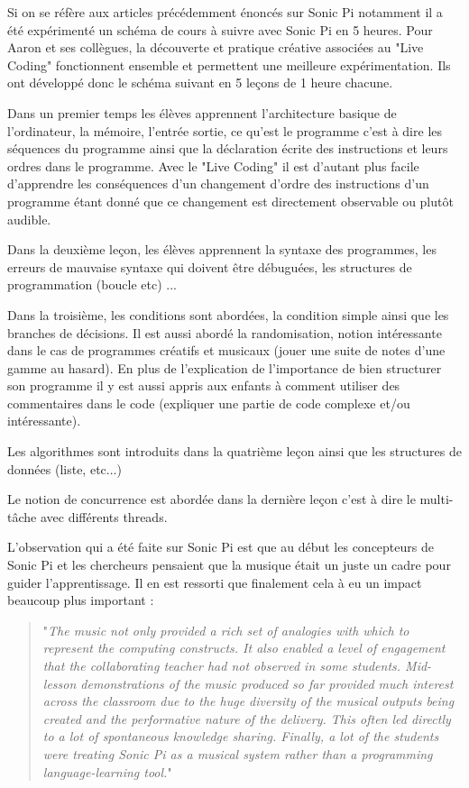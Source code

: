 Si on se réfère aux articles précédemment énoncés sur Sonic Pi notamment \cite{19} il a été expérimenté un schéma de cours à suivre avec Sonic Pi en 5 heures. Pour Aaron et ses collègues, la découverte et pratique créative associées au "Live Coding" fonctionnent ensemble et permettent une meilleure expérimentation. Ils ont développé donc le schéma suivant en 5 leçons de 1 heure chacune.

Dans un premier temps les élèves apprennent l'architecture basique de l'ordinateur, la mémoire, l'entrée sortie, ce qu'est le programme c'est à dire les séquences du programme ainsi que la déclaration écrite des instructions et leurs ordres dans le programme. Avec le "Live Coding" il est d'autant plus facile d'apprendre les conséquences d'un changement d'ordre des instructions d'un programme étant donné que ce changement est directement observable ou plutôt audible.

Dans la deuxième leçon, les élèves apprennent la syntaxe des programmes, les erreurs de mauvaise syntaxe qui doivent être débuguées, les structures de programmation (boucle etc) ...

\newpage

Dans la troisième, les conditions sont abordées, la condition simple ainsi que les branches de décisions. Il est aussi abordé la randomisation, notion intéressante dans le cas de programmes créatifs et musicaux (jouer une suite de notes d'une gamme au hasard). En plus de l'explication de l'importance de bien structurer son programme il y est aussi appris aux enfants à comment utiliser des commentaires dans le code (expliquer une partie de code complexe et/ou intéressante).

Les algorithmes sont introduits dans la quatrième leçon ainsi que les structures de données (liste, etc...)

Le notion de concurrence est abordée dans la dernière leçon c'est à dire le multi-tâche avec différents threads.

L'observation qui a été faite sur Sonic Pi est que au début les concepteurs de Sonic Pi et les chercheurs pensaient que la musique était un juste un cadre pour guider l'apprentissage. Il en est ressorti que finalement cela à eu un impact beaucoup plus important :

\begin{quote}
    "\textit{The
music not only provided a rich set of analogies with which to represent the computing
constructs. It also enabled a level of engagement that the collaborating teacher had not
observed in some students. Mid-lesson demonstrations of the music produced so far provided
much interest across the classroom due to the huge diversity of the musical outputs
being created and the performative nature of the delivery. This often led directly to a lot of
spontaneous knowledge sharing. Finally, a lot of the students were treating Sonic Pi as a
musical system rather than a programming language-learning tool.}"

\end{quote}

